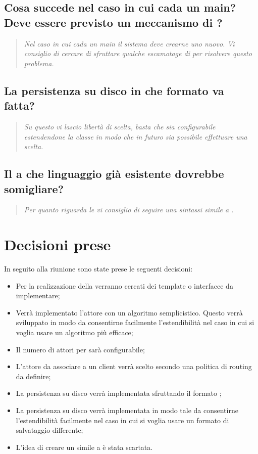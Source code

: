 \documentclass{scalatekids-article}
\begin{document}
\subsection{Cosa succede nel caso in cui cada un main? Deve essere previsto un meccanismo di ?}
\begin{quote}
  \textit{Nel caso in cui cada un main il sistema deve crearne uno nuovo. Vi consiglio di cercare di sfruttare qualche escamotage di  per risolvere questo problema.\\}
\end{quote}
\subsection{La persistenza su disco in che formato va fatta?}
\begin{quote}
  \textit{Su questo vi lascio libertà di scelta, basta che sia configurabile estendendone la classe in modo che in futuro sia possibile effettuare una scelta.\\}
\end{quote}
\subsection{Il  a che linguaggio già esistente dovrebbe somigliare?}
\begin{quote}
  \textit{Per quanto riguarda le  vi consiglio di seguire una sintassi simile a .\\}
\end{quote}
\section{Decisioni prese}
In seguito alla riunione sono state prese le seguenti decisioni:
\begin{itemize}
\item Per la realizzazione della  verranno cercati dei template o interfacce da implementare;
\item Verrà implementato l'attore  con un algoritmo semplicistico. Questo verrà sviluppato in modo da consentirne facilmente l'estendibilità nel caso in cui si voglia usare un algoritmo più efficace;
\item Il numero di attori  per  sarà configurabile;
\item L'attore  da associare a un client verrà scelto secondo una politica di routing da definire;
\item La persistenza su disco verrà implementata sfruttando il formato ;
\item La persistenza su disco verrà implementata in modo tale da consentirne l'estendibilità facilmente nel caso in cui si voglia usare un formato di salvataggio differente;
\item L'idea di creare un  simile a  è stata scartata.
\end{itemize}
\end{document}
